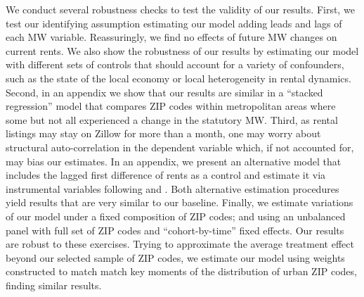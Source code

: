 We conduct several robustness checks to test the validity of our results.
First, we test our identifying assumption estimating our model adding leads and 
lags of each MW variable.
Reassuringly, we find no effects of future MW changes on current rents.
We also show the robustness of our results by estimating our model with 
different sets of controls that should account for a variety of confounders, 
such as the state of the local economy or local heterogeneity in 
rental dynamics.
Second, in an appendix we show that our results are similar in a ``stacked 
regression'' model that compares ZIP codes within metropolitan areas where some 
but not all experienced a change in the statutory MW.
Third, as rental listings may stay on Zillow for more than a month, one may worry 
about structural auto-correlation in the dependent variable which, if not 
accounted for, may bias our estimates.
In an appendix, we present an alternative model that includes the lagged first 
difference of rents as a control and estimate it via instrumental variables
following \textcite{ArellanoBond1991} and \textcite{MeerWest2016}.
Both alternative estimation procedures yield results that are very similar to our 
baseline.
Finally, we estimate variations of our model under a fixed composition of ZIP 
codes; and using an unbalanced panel with full set of ZIP codes and 
``cohort-by-time'' fixed effects.
Our results are robust to these exercises.
Trying to approximate the average treatment effect beyond our 
selected sample of ZIP codes,
we estimate our model using weights constructed to match match key moments of 
the distribution of urban ZIP codes, finding similar results.


